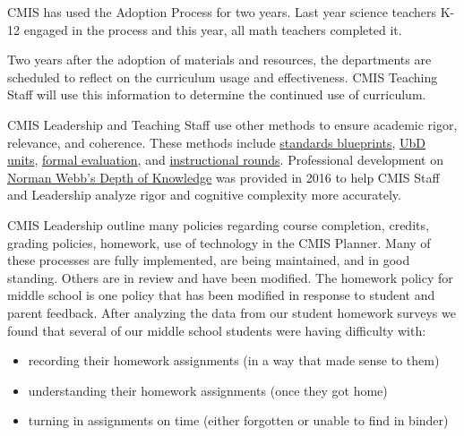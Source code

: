 \begin{findings}
CMIS has used the Adoption Process for two years. Last year science teachers K-12 engaged in the process and this year, all math teachers completed it. 

Two years after the adoption of materials and resources, the departments are scheduled to reflect on the curriculum usage and effectiveness. CMIS Teaching Staff will use this information to determine the continued use of curriculum. 


CMIS Leadership and Teaching Staff use other methods to ensure academic rigor, relevance, and coherence. These methods include \href{https://drive.google.com/drive/folders/0ByVFfrm0zfolfmV1QTNuWFdUVHV3dDVrRFMzUFBMazY0VGs1eWc0cmFjVGcwNDdsQkdrZzA?usp=sharing}{standards blueprints}, \href{https://docs.google.com/a/cmis.ac.th/document/d/1kL1VjwfuMMa7NaWmwUrEah1BM-jJRmLAd4VJzR3HoPs/edit?usp=sharing}{UbD units}, \href{https://docs.google.com/document/d/1AlY83UtysbjvAIvfp4hKRa1Ktu0FhEHAOAMKYI9ai1M/edit?usp=sharing}{formal evaluation}, and \href{https://docs.google.com/a/cmis.ac.th/presentation/d/1j9DjUPHbIprWWbftcBxiF35BKmzU5C_lW9Z78f8CAeE/edit?usp=sharing}{instructional rounds}.  Professional development on \href{https://drive.google.com/a/cmis.ac.th/file/d/0ByVFfrm0zfolNVJmeEJwcHUxbjg/view?usp=sharing}{Norman Webb’s Depth of Knowledge} was provided in 2016 to help CMIS Staff and Leadership analyze rigor and cognitive complexity more accurately. 


CMIS Leadership outline many policies regarding course completion, credits, grading policies, homework, use of technology in the CMIS Planner. Many of these processes are fully implemented, are being maintained, and in good standing. Others are in review and have been modified. The homework policy for middle school is one policy that has been modified in response to student and parent feedback.  After analyzing the data from our student homework surveys we found that several of our middle school students were having difficulty with:

\begin{itemize}
\item recording their homework assignments (in a way that made sense to them)
\item understanding their homework assignments (once they got home) 
\item turning in assignments on time (either forgotten or unable to find in binder)
\end{itemize}


\end{findings}
